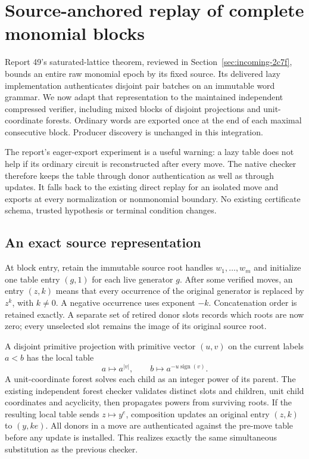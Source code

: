 \section{Source-anchored replay of complete monomial blocks}
\label{sec:anchored-replay}

Report 49's saturated-lattice theorem, reviewed in
Section~\ref{sec:incoming-2c7f}, bounds an entire raw monomial epoch by its
fixed source. Its delivered lazy implementation authenticates disjoint pair
batches on an immutable word grammar. We now adapt that representation to
the maintained independent compressed verifier, including mixed blocks of
disjoint projections and unit-coordinate forests. Ordinary words are exported
once at the end of each maximal consecutive block. Producer discovery is
unchanged in this integration.

The report's eager-export experiment is a useful warning: a lazy table does
not help if its ordinary circuit is reconstructed after every move. The
native checker therefore keeps the table through donor authentication as
well as through updates. It falls back to the existing direct replay for an
isolated move and exports at every normalization or nonmonomial boundary.
No existing certificate schema, trusted hypothesis or terminal condition
changes.

\subsection{An exact source representation}

At block entry, retain the immutable source root handles $w_1,\ldots,w_m$
and initialize one table entry $(g,1)$ for each live generator $g$. After
some verified moves, an entry $(z,k)$ means that every occurrence of the
original generator is replaced by $z^k$, with $k\ne0$. A negative occurrence
uses exponent $-k$. Concatenation order is retained exactly. A separate set
of retired donor slots records which roots are now zero; every unselected
slot remains the image of its original source root.

A disjoint primitive projection with primitive vector $(u,v)$ on the current
labels $a<b$ has the local table
\[
 a\longmapsto a^{|v|},\qquad
 b\longmapsto a^{-u\operatorname{sign}(v)}.
\]
A unit-coordinate forest solves each child as an integer power of its parent.
The existing independent forest checker validates distinct slots and children,
unit child coordinates and acyclicity, then propagates powers from surviving
roots. If the resulting local table sends $z\mapsto y^e$, composition updates
an original entry $(z,k)$ to $(y,ke)$. All donors in a move are authenticated
against the pre-move table before any update is installed. This realizes
exactly the same simultaneous substitution as the previous checker.

